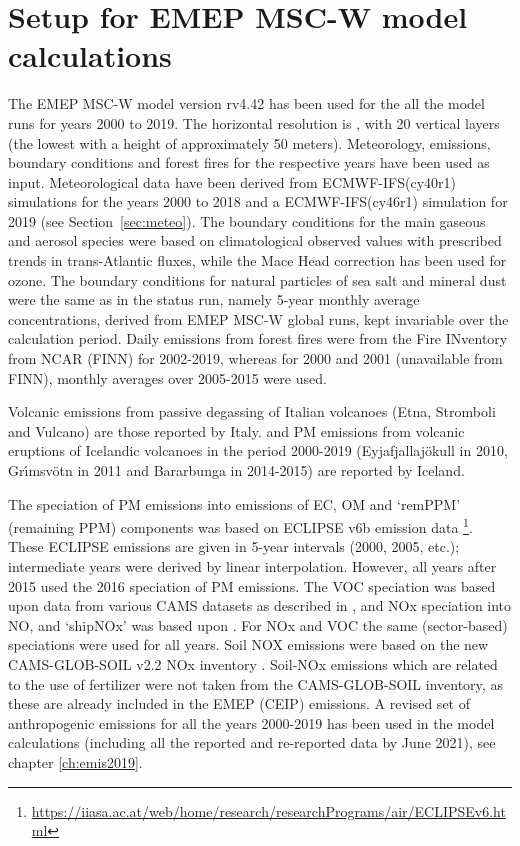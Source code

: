 
\section{\label{EMEPmodelcalc}{Setup for EMEP MSC-W model calculations}}
The EMEP MSC-W model version rv4.42 has been used for the all the model runs for years 2000 to 2019. The horizontal resolution is \resZO, with 20 vertical layers (the lowest with a height of approximately 50 meters).
 Meteorology, emissions, boundary conditions and forest fires for the respective years have been used as input. Meteorological data have been
 derived from ECMWF-IFS(cy40r1) simulations for the years 2000 to 2018 and a ECMWF-IFS(cy46r1) simulation for 2019 (see Section~\ref{sec:meteo}). 
 The boundary conditions for the main gaseous and aerosol species were based on climatological observed values with prescribed trends in trans-Atlantic fluxes, while the Mace
Head correction has been used for ozone. The boundary conditions for natural particles of
sea salt and mineral dust were the same as in the status run, namely 5-year monthly average
concentrations, derived from EMEP MSC-W global runs, kept invariable over the calculation
period.
Daily emissions from forest fires were from the Fire INventory from NCAR (FINN) for 2002-2019,
whereas for 2000 and 2001 (unavailable from FINN), monthly averages over 2005-2015 were
used.

Volcanic \sox emissions from passive degassing of Italian volcanoes (Etna,
Stromboli and Vulcano) are those reported by
Italy. \sox and PM emissions from volcanic eruptions of Icelandic volcanoes in the period 2000-2019 (Eyjafjallaj\"okull in 2010, Gr{\'{\i}}msv{\"{o}}tn in 2011  and  Bar\dh{}arbunga in 2014-2015) are reported by Iceland. 
 
The speciation of PM emissions into emissions of EC, OM and `remPPM' (remaining PPM) components was based on ECLIPSE v6b emission data \footnote{\url{https://iiasa.ac.at/web/home/research/researchPrograms/air/ECLIPSEv6.html}}. These ECLIPSE emissions are given in 5-year intervals (2000, 2005, etc.); intermediate years were derived by linear interpolation. However, all years after 2015 used the 2016 speciation of PM emissions. The VOC speciation was based upon data from various CAMS datasets as described in \cite{R2020:ModDev}, and NOx speciation into NO,  and `shipNOx' was based upon . For NOx and VOC the same (sector-based) speciations were used for all years.
Soil NOX emissions were based on the new CAMS-GLOB-SOIL v2.2 NOx inventory \citet{SimpsonDarras:2021}. Soil-NOx emissions which are related to the use of fertilizer were not taken from the CAMS-GLOB-SOIL inventory, as these are already included in the EMEP (CEIP) emissions.
A revised set of anthropogenic emissions for all the years 2000-2019 has been used in the model calculations (including all the reported and re-reported data by June 2021), see chapter \ref{ch:emis2019}.


